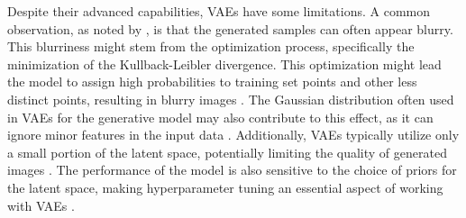 Despite their advanced capabilities, VAEs have some limitations. A common observation, as noted by \citeauthor{GoodfellowDeepLearning}, is that the generated samples can often appear blurry. This blurriness might stem from the optimization process, specifically the minimization of the Kullback-Leibler divergence. This optimization might lead the model to assign high probabilities to training set points and other less distinct points, resulting in blurry images \citep{GoodfellowDeepLearning}. The Gaussian distribution often used in VAEs for the generative model may also contribute to this effect, as it can ignore minor features in the input data \citep{GoodfellowDeepLearning}. Additionally, VAEs typically utilize only a small portion of the latent space, potentially limiting the quality of generated images \citep{GoodfellowDeepLearning}. The performance of the model is also sensitive to the choice of priors for the latent space, making hyperparameter tuning an essential aspect of working with VAEs \citep{kingmaVAE, higginsVAE}.